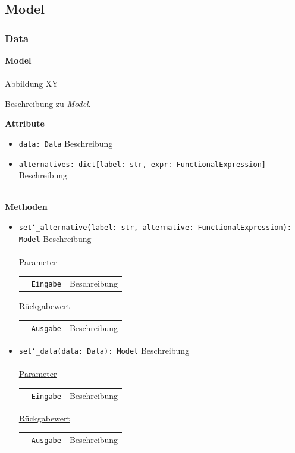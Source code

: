 \documentclass{article}
\begin{document}
\newpage
\subsection{Model}
\subsubsection{Data}
\textbf{\large{Model}}\\\\
Abbildung XY

Beschreibung zu \textit{Model}.
\newline \newline

\textbf{{Attribute}}
\begin{itemize}
\item \texttt{data: Data} \newline Beschreibung
\item \texttt{alternatives: dict[label: str, expr: FunctionalExpression]} \newline Beschreibung
\\\\
\end{itemize}

\textbf{{Methoden}}
\begin{itemize}
\item \texttt{set\char`_alternative(label: str, alternative: FunctionalExpression): Model} \newline Beschreibung
\\\\
\underline{{Parameter}}

\begin{tabular}{lll}
 & \texttt{Eingabe} & Beschreibung \\
\end{tabular}

\underline{{Rückgabewert}}

\begin{tabular}{lll}
 & \texttt{Ausgabe} & Beschreibung \\
\end{tabular}

\item \texttt{set\char`_data(data: Data): Model} \newline Beschreibung
\\\\
\underline{{Parameter}}

\begin{tabular}{lll}
 & \texttt{Eingabe} & Beschreibung \\
\end{tabular}

\underline{{Rückgabewert}}

\begin{tabular}{lll}
 & \texttt{Ausgabe} & Beschreibung \\
\end{tabular}
\end{itemize}
\end{document}
